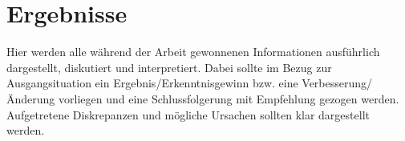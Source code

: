 \chapter{Ergebnisse}
\label{chap4:ergebnisse}
Hier werden alle während der Arbeit gewonnenen Informationen ausführlich dargestellt, diskutiert und interpretiert. Dabei sollte im Bezug zur Ausgangsituation ein Ergebnis/Erkenntnisgewinn bzw. eine Verbesserung/Änderung vorliegen und eine Schlussfolgerung mit Empfehlung gezogen werden. Aufgetretene Diskrepanzen und mögliche Ursachen sollten klar dargestellt werden.